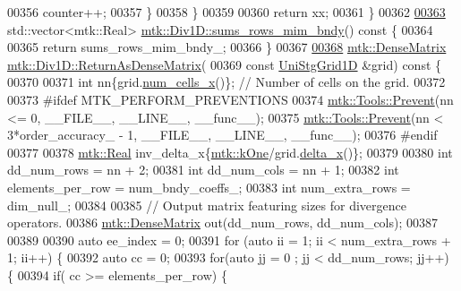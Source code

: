 \begin{DoxyCode}
{{00356       counter++;
00357     \}
00358   \}
00359 
00360   \textcolor{keywordflow}{return} xx;
00361 \}
00362 
\hypertarget{mtk__div__1d_8cc_source_l00363}{}\hyperlink{classmtk_1_1Div1D_a8c611354217cb15cdb41c23b067fb398}{00363} std::vector<mtk::Real> \hyperlink{classmtk_1_1Div1D_a8c611354217cb15cdb41c23b067fb398}{mtk::Div1D::sums\_rows\_mim\_bndy}()\textcolor{keyword}{ const }\{
00364 
00365   \textcolor{keywordflow}{return} sums\_rows\_mim\_bndy\_;
00366 \}
00367 
\hypertarget{mtk__div__1d_8cc_source_l00368}{}\hyperlink{classmtk_1_1Div1D_a213fddbaaf86e4840c6a9649b69c2d49}{00368} \hyperlink{classmtk_1_1DenseMatrix}{mtk::DenseMatrix} \hyperlink{classmtk_1_1Div1D_a213fddbaaf86e4840c6a9649b69c2d49}{mtk::Div1D::ReturnAsDenseMatrix}(
00369   \textcolor{keyword}{const} \hyperlink{classmtk_1_1UniStgGrid1D}{UniStgGrid1D} &grid)\textcolor{keyword}{ const }\{
00370 
00371   \textcolor{keywordtype}{int} nn\{grid.\hyperlink{classmtk_1_1UniStgGrid1D_af1b3729d8afa07be5b2775ed68015b80}{num\_cells\_x}()\}; \textcolor{comment}{// Number of cells on the grid.}
00372 
00373 \textcolor{preprocessor}{  #ifdef MTK\_PERFORM\_PREVENTIONS}
00374   \hyperlink{classmtk_1_1Tools_a332324c6f25e66be9dff48c5987a3b9f}{mtk::Tools::Prevent}(nn <= 0, \_\_FILE\_\_, \_\_LINE\_\_, \_\_func\_\_);
00375   \hyperlink{classmtk_1_1Tools_a332324c6f25e66be9dff48c5987a3b9f}{mtk::Tools::Prevent}(nn < 3*order\_accuracy\_ - 1, \_\_FILE\_\_, \_\_LINE\_\_, \_\_func\_\_);
00376 \textcolor{preprocessor}{  #endif}
00377 
00378   \hyperlink{group__c01-roots_gac080bbbf5cbb5502c9f00405f894857d}{mtk::Real} inv\_delta\_x\{\hyperlink{group__c01-roots_ga26407c24d43b6b95480943340d285c71}{mtk::kOne}/grid.\hyperlink{classmtk_1_1UniStgGrid1D_a6e7173b01241632cf509496d66b9f74c}{delta\_x}()\};
00379 
00380   \textcolor{keywordtype}{int} dd\_num\_rows = nn + 2;
00381   \textcolor{keywordtype}{int} dd\_num\_cols = nn + 1;
00382   \textcolor{keywordtype}{int} elements\_per\_row = num\_bndy\_coeffs\_;
00383   \textcolor{keywordtype}{int} num\_extra\_rows = dim\_null\_;
00384 
00385   \textcolor{comment}{// Output matrix featuring sizes for divergence operators.}
00386   \hyperlink{classmtk_1_1DenseMatrix}{mtk::DenseMatrix} out(dd\_num\_rows, dd\_num\_cols);
00387 
00389 
00390   \textcolor{keyword}{auto} ee\_index = 0;
00391   \textcolor{keywordflow}{for} (\textcolor{keyword}{auto} ii = 1; ii < num\_extra\_rows + 1; ii++) \{
00392     \textcolor{keyword}{auto} cc = 0;
00393     \textcolor{keywordflow}{for}(\textcolor{keyword}{auto} jj = 0 ; jj < dd\_num\_rows; jj++) \{
00394       \textcolor{keywordflow}{if}( cc >= elements\_per\_row) \{
}}
\end{DoxyCode}
